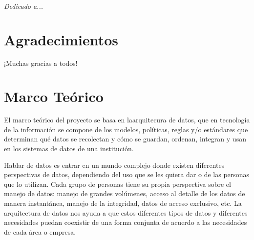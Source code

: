 \documentclass[a4paper,openright,12pt]{book}
\begin{document}
\newpage
$\ $
\thispagestyle{empty}

\chapter*{}
\begin{flushright}
\textit{Dedicado a... }
\end{flushright}

\chapter*{Agradecimientos}

¡Muchas gracias a todos!

\tableofcontents

\cleardoublepage
\listoffigures

\cleardoublepage
\listoftables

\chapter*{Marco Teórico}
\label{cap.mteorico}

El marco teórico del proyecto se basa en laarquitecura de datos, que en
tecnología de la información se compone de los modelos, políticas, reglas y/o
estándares que determinan qué datos se recolectan y cómo se guardan, ordenan,
integran y usan en los sistemas de datos de una institución.

Hablar de datos es entrar en un mundo complejo donde existen diferentes
perspectivas de datos, dependiendo del uso que se les quiera dar o de las
personas que lo utilizan. Cada grupo de personas tiene su propia perspectiva
sobre el manejo de datos: manejo de grandes volúmenes, acceso al detalle de los
datos de manera instantánea, manejo de la integridad, datos de acceso exclusivo,
etc. La arquitectura de datos nos ayuda a que estos diferentes tipos de datos y
diferentes necesidades puedan coexistir de una forma conjunta de acuerdo a las
necesidades de cada área o empresa.
\end{document}
